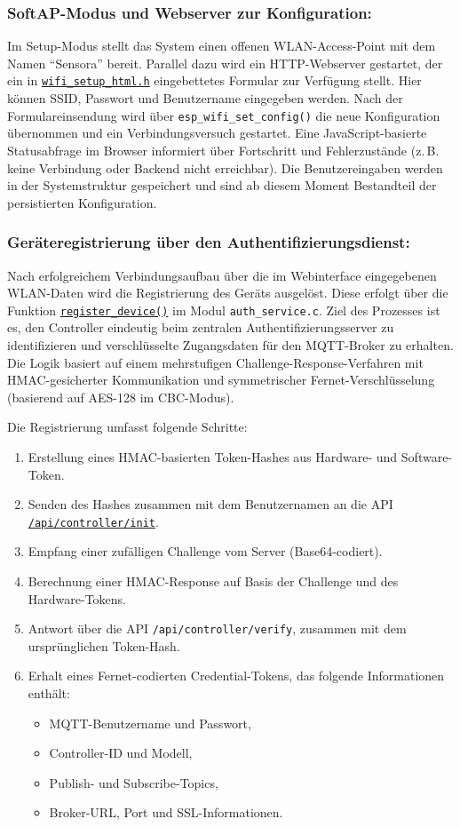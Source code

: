 \subsubsection{SoftAP-Modus und Webserver zur Konfiguration:}  
Im Setup-Modus stellt das System einen offenen WLAN-Access-Point mit dem Namen \enquote{Sensora} bereit. Parallel dazu wird ein HTTP-Webserver gestartet, der ein in \texttt{\url{wifi\_setup\_html.h}} eingebettetes Formular zur Verfügung stellt. Hier können SSID, Passwort und Benutzername eingegeben werden. Nach der Formulareinsendung wird über \texttt{esp\_wifi\_set\_config()} die neue Konfiguration übernommen und ein Verbindungsversuch gestartet. Eine JavaScript-basierte Statusabfrage im Browser informiert über Fortschritt und Fehlerzustände (z.\,B. keine Verbindung oder Backend nicht erreichbar). Die Benutzereingaben werden in der Systemstruktur gespeichert und sind ab diesem Moment Bestandteil der persistierten Konfiguration.

\subsubsection{Geräteregistrierung über den Authentifizierungsdienst:}  
Nach erfolgreichem Verbindungsaufbau über die im Webinterface eingegebenen WLAN-Daten wird die Registrierung des Geräts ausgelöst. Diese erfolgt über die Funktion \texttt{\url{register\_device()}} im Modul \texttt{auth\_service.c}. Ziel des Prozesses ist es, den Controller eindeutig beim zentralen Authentifizierungsserver zu identifizieren und verschlüsselte Zugangsdaten für den MQTT-Broker zu erhalten. Die Logik basiert auf einem mehrstufigen Challenge-Response-Verfahren mit HMAC-gesicherter Kommunikation und symmetrischer Fernet-Verschlüsselung (basierend auf AES-128 im CBC-Modus).

Die Registrierung umfasst folgende Schritte:
\begin{enumerate}
	\item Erstellung eines HMAC-basierten Token-Hashes aus Hardware- und Software-Token.
	\item Senden des Hashes zusammen mit dem Benutzernamen an die API \texttt{\url{/api/controller/init}}.
	\item Empfang einer zufälligen Challenge vom Server (Base64-codiert).
	\item Berechnung einer HMAC-Response auf Basis der Challenge und des Hardware-Tokens.
	\item Antwort über die API \texttt{/api/controller/verify}, zusammen mit dem ursprünglichen Token-Hash.
	\item Erhalt eines Fernet-codierten Credential-Tokens, das folgende Informationen enthält:
	\begin{itemize}
		\item MQTT-Benutzername und Passwort,
		\item Controller-ID und Modell,
		\item Publish- und Subscribe-Topics,
		\item Broker-URL, Port und SSL-Informationen.
	\end{itemize}
\end{enumerate}

